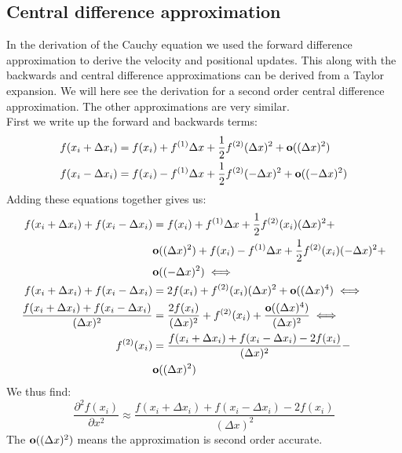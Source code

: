 \subsection{Central difference approximation}
In the derivation of the Cauchy equation we used the forward difference approximation to derive the velocity and positional updates. This along with the backwards and central difference approximations can be derived from a Taylor expansion. We will here see the derivation for a second order central difference approximation. The other approximations are very similar.\\
First we write up the forward and backwards terms:
\begin{align*}
	f(x_i+\Delta x_i) &= f(x_i) + f^{(1)}\Delta x + \frac{1}{2}f^{(2)}(\Delta x)^2 + \text{\textbf{o}}((\Delta x)^2)\\
	f(x_i-\Delta x_i) &= f(x_i) - f^{(1)}\Delta x + \frac{1}{2}f^{(2)}(-\Delta x)^2 + \text{\textbf{o}}((-\Delta x)^2)
\end{align*}
Adding these equations together gives us:
\begin{align*}
	f(x_i+\Delta x_i) + f(x_i-\Delta x_i) &= f(x_i) + f^{(1)}\Delta x + \frac{1}{2}f^{(2)}(x_i)(\Delta x)^2 +\\ 
	&\text{\textbf{o}}((\Delta x)^2)+ f(x_i) - f^{(1)}\Delta x + \frac{1}{2}f^{(2)}(x_i)(-\Delta x)^2 +\\
	&\text{\textbf{o}}((-\Delta x)^2) \iff\\
	f(x_i+\Delta x_i) + f(x_i-\Delta x_i) &= 2f(x_i) + f^{(2)}(x_i)(\Delta x)^2 + \text{\textbf{o}}((\Delta x)^4)\iff\\
	\frac{f(x_i+\Delta x_i) + f(x_i-\Delta x_i)}{(\Delta x)^2} &= \frac{2f(x_i)}{(\Delta x)^2} + f^{(2)}(x_i) + \frac{\text{\textbf{o}}((\Delta x)^4)}{(\Delta x)^2} \iff\\
	f^{(2)}(x_i) &= \frac{f(x_i+\Delta x_i) + f(x_i-\Delta x_i) - 2f(x_i)}{(\Delta x)^2} - \\ 
	& \text{\textbf{o}}((\Delta x)^2)
\end{align*}
We thus find:
\begin{equation*}
	\frac{\partial^2f(x_i)}{\partial x^2} \approx \frac{f(x_i+\Delta x_i) + f(x_i-\Delta x_i) - 2f(x_i)}{(\Delta x)^2}
\end{equation*}
The $ \text{\textbf{o}}((\Delta x)^2)$ means the approximation is second order accurate.